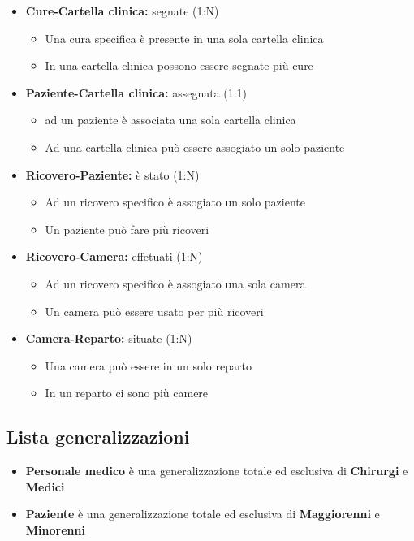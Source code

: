 \documentclass[a4paper, 10pt]{article}
\begin{document}
\begin{spacing}{0.3}
\begin{itemize}
     \item \textbf{Cure-Cartella clinica:} segnate (1:N)
    \begin{itemize}
        \item Una cura specifica è presente in una sola cartella clinica
        \item In una cartella clinica possono essere segnate più cure
    \end{itemize}
     \item \textbf{Paziente-Cartella clinica:} assegnata (1:1)
    \begin{itemize}
        \item ad un paziente è associata una sola cartella clinica
        \item Ad una cartella clinica può essere assogiato un solo paziente
    \end{itemize}
     \item \textbf{Ricovero-Paziente:} è stato (1:N)
    \begin{itemize}
        \item Ad un ricovero specifico è assogiato un solo paziente
        \item Un paziente può fare più ricoveri
    \end{itemize}
    \item \textbf{Ricovero-Camera:} effetuati (1:N)
    \begin{itemize}
        \item Ad un ricovero specifico è assogiato una sola camera
        \item Un camera può essere usato per più ricoveri
    \end{itemize}
    \item \textbf{Camera-Reparto:} situate (1:N)
    \begin{itemize}
        \item Una camera può essere in un solo reparto
        \item In un reparto ci sono più camere
    \end{itemize}
\end{itemize}
\subsection{Lista generalizzazioni}

\begin{itemize}
    \item \textbf{Personale medico} è una generalizzazione totale ed esclusiva di \textbf{Chirurgi} e \textbf{Medici}
    \item \textbf{Paziente} è una generalizzazione totale ed esclusiva di \textbf{Maggiorenni} e \textbf{Minorenni}
\end{itemize}
\end{spacing}
\end{document}
